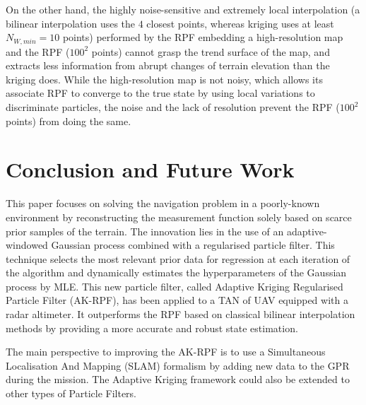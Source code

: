 \documentclass[conference]{IEEEtran}
\begin{document}
On the other hand, the highly noise-sensitive and extremely local interpolation (a bilinear interpolation uses the $4$ closest points, whereas kriging uses at least $N_{W,min} = 10$ points) performed by the RPF embedding a high-resolution map and the RPF ($100^2$ points) cannot grasp the trend surface of the map, and extracts less information from abrupt changes of terrain elevation than the kriging does. While the high-resolution map is not noisy, which allows its associate RPF to converge to the true state by using local variations to discriminate particles, the noise and the lack of resolution prevent the RPF ($100^2$ points) from doing the same.

\section{Conclusion and Future Work}
This paper focuses on solving the navigation problem in a poorly-known environment by reconstructing the measurement function solely based on scarce prior samples of the terrain. The innovation lies in the use of an adaptive-windowed Gaussian process combined with a regularised particle filter. This technique selects the most relevant prior data for regression at each iteration of the algorithm and dynamically estimates the hyperparameters of the Gaussian process by MLE. This new particle filter, called Adaptive Kriging Regularised Particle Filter (AK-RPF), has been applied to a TAN of UAV equipped with a radar altimeter. It outperforms the RPF based on classical bilinear interpolation methods by providing a more accurate and robust state estimation.

The main perspective to improving the AK-RPF is to use a Simultaneous Localisation And Mapping (SLAM) formalism by adding new data to the GPR during the mission. The Adaptive Kriging framework could also be extended to other types of Particle Filters.

\vspace*{-1mm}
\end{document}
